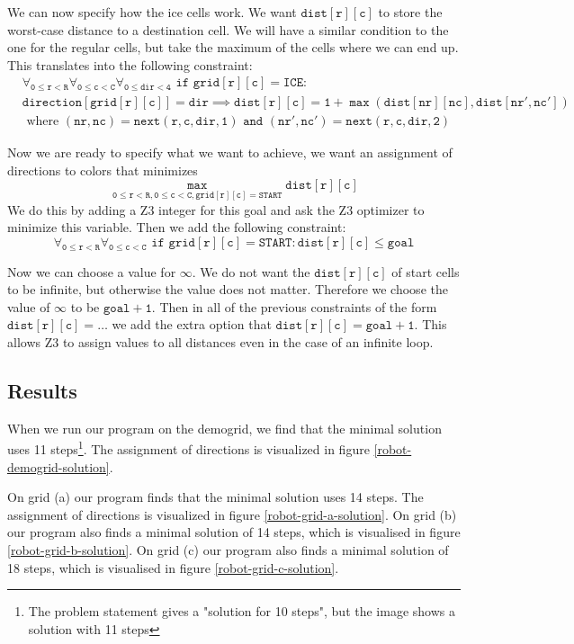 \documentclass{scrartcl}
\begin{document}
	We can now specify how the ice cells work. We want $\mathtt{dist[r][c]}$ to store the worst-case distance to a destination cell. We will have a similar condition to the one for the regular cells, but take the maximum of the cells where we can end up. This translates into the following constraint:
	\begin{align*}
		&\mathtt{\forall_{0\le r<R}\forall_{0\le c<C}\forall_{0\le dir<4}\text{ if } grid[r][c] = ICE:}\\
		&\mathtt{direction[grid[r][c]]=dir \implies dist[r][c]=1+\max(dist[nr][nc],dist[nr',nc'])}\\
		&\text{ where }
		\mathtt{(nr,nc) = next(r,c,dir,1) \text{ and } (nr',nc') = next(r,c,dir,2)}
	\end{align*}

	Now we are ready to specify what we want to achieve, we want an assignment of directions to colors that minimizes
	$$\mathtt{\max_{0\le r < R, 0\le c < C, grid[r][c]=START} dist[r][c]}$$
	We do this by adding a Z3 integer for this goal and ask the Z3 optimizer to minimize this variable. Then we add the following constraint:
	$$\mathtt{\forall_{0\le r<R}\forall_{0\le c<C}\text{ if }grid[r][c]=START: dist[r][c]\le goal}$$

	Now we can choose a value for $\infty$. We do not want the $\mathtt{dist[r][c]}$ of start cells to be infinite, but otherwise the value does not matter. Therefore we choose the value of $\infty$ to be $\mathtt{goal+1}$. Then in all of the previous constraints of the form $\mathtt{dist[r][c]=\ldots}$ we add the extra option that $\mathtt{dist[r][c]=goal+1}$. This allows Z3 to assign values to all distances even in the case of an infinite loop.

	\subsection{Results} %
	\label{sub:results}
	When we run our program on the demogrid, we find that the minimal solution uses 11 steps\footnote{The problem statement gives a "solution for 10 steps", but the image shows a solution with 11 steps}. The assignment of directions is visualized in figure \ref{robot-demogrid-solution}.

	On grid (a) our program finds that the minimal solution uses 14 steps. The
	assignment of directions is visualized in figure
	\ref{robot-grid-a-solution}. On grid (b) our program also finds a minimal
	solution of 14 steps, which is visualised in figure
	\ref{robot-grid-b-solution}. On grid (c) our program also finds a minimal
	solution of 18 steps, which is visualised in figure
	\ref{robot-grid-c-solution}.
\end{document}
